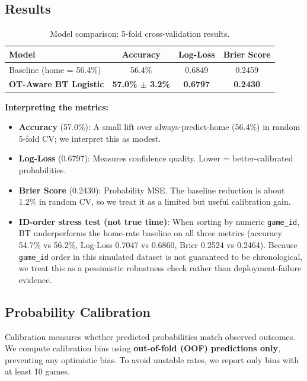 \documentclass[11pt, a4paper]{article}
\begin{document}
\subsection{Results}

\begin{table}[H]
\centering
\caption{Model comparison: 5-fold cross-validation results.}
\label{tab:cv}
\begin{tabular}{lccc}
\toprule
\textbf{Model} & \textbf{Accuracy} & \textbf{Log-Loss} & \textbf{Brier Score} \\
\midrule
Baseline (home = 56.4\%) & 56.4\% & 0.6849 & 0.2459 \\
\textbf{OT-Aware BT Logistic} & \textbf{57.0\% $\pm$ 3.2\%} & \textbf{0.6797} & \textbf{0.2430} \\
\bottomrule
\end{tabular}
\end{table}

\noindent\textbf{Interpreting the metrics:}
\begin{itemize}
    \item \textbf{Accuracy} (57.0\%): A small lift over always-predict-home (56.4\%) in random 5-fold CV; we interpret this as modest.
    \item \textbf{Log-Loss} (0.6797): Measures confidence quality. Lower = better-calibrated probabilities.
    \item \textbf{Brier Score} (0.2430): Probability MSE. The baseline reduction is about 1.2\% in random CV, so we treat it as a limited but useful calibration gain.
    \item \textbf{ID-order stress test (not true time)}: When sorting by numeric \texttt{game\_id}, BT underperforms the home-rate baseline on all three metrics (accuracy 54.7\% vs 56.2\%, Log-Loss 0.7047 vs 0.6860, Brier 0.2524 vs 0.2464). Because \texttt{game\_id} order in this simulated dataset is not guaranteed to be chronological, we treat this as a pessimistic robustness check rather than deployment-failure evidence.
\end{itemize}

\subsection{Probability Calibration}

Calibration measures whether predicted probabilities match observed outcomes. We compute calibration bins using \textbf{out-of-fold (OOF) predictions only}, preventing any optimistic bias.
To avoid unstable rates, we report only bins with at least 10 games.
\end{document}
